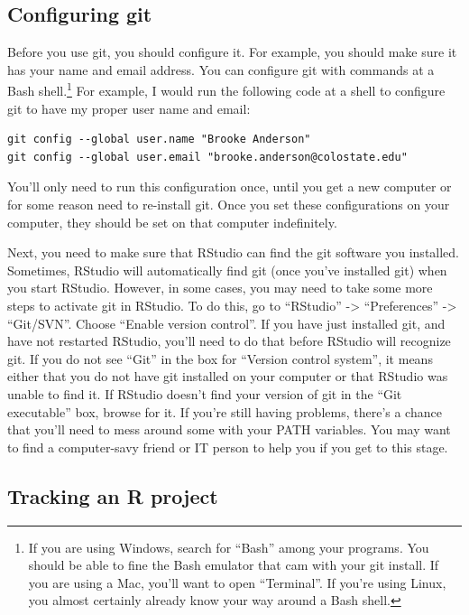 \documentclass[]{tufte-book}
\begin{document}
\hypertarget{configuring-git}{%
\subsection{Configuring git}\label{configuring-git}}

Before you use git, you should configure it. For example, you should make sure
it has your name and email address. You can configure git with commands at a
Bash shell.\footnote{If you are using Windows, search for ``Bash'' among your programs.
  You should be able to fine the Bash emulator that cam with your git install. If
  you are using a Mac, you'll want to open ``Terminal''. If you're using Linux, you
  almost certainly already know your way around a Bash shell.} For example, I
would run the following code at a shell to configure git to have my proper user
name and email:

\begin{verbatim}
git config --global user.name "Brooke Anderson"
git config --global user.email "brooke.anderson@colostate.edu"
\end{verbatim}

You'll only need to run this configuration once, until you get a new computer or
for some reason need to re-install git. Once you set these configurations on
your computer, they should be set on that computer indefinitely.

Next, you need to make sure that RStudio can find the git software you
installed. Sometimes, RStudio will automatically find git (once you've installed
git) when you start RStudio. However, in some cases, you may need to take some
more steps to activate git in RStudio. To do this, go to ``RStudio'' -\textgreater{}
``Preferences'' -\textgreater{} ``Git/SVN''. Choose ``Enable version control''. If you have just
installed git, and have not restarted RStudio, you'll need to do that before
RStudio will recognize git. If you do not see ``Git'' in the box for ``Version
control system'', it means either that you do not have git installed on your
computer or that RStudio was unable to find it. If RStudio doesn't find your
version of git in the ``Git executable'' box, browse for it. If you're still
having problems, there's a chance that you'll need to mess around some with your
PATH variables. You may want to find a computer-savy friend or IT person to help
you if you get to this stage.

\hypertarget{tracking-an-r-project}{%
\subsection{Tracking an R project}\label{tracking-an-r-project}}
\end{document}
